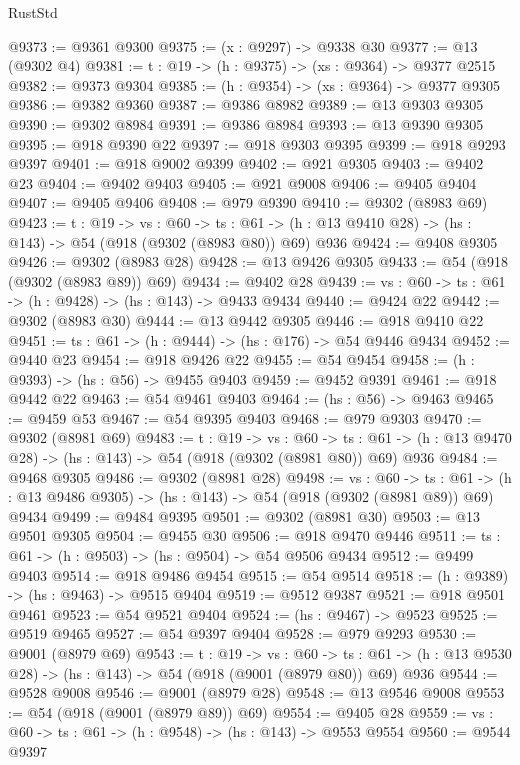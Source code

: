 \begin{lexlean}{RustStd}
\begin{coremodule}
@9373 := @9361 @9300
@9375 := (x : @9297) -> @9338 @30
@9377 := @13 (@9302 @4)
@9381 := {t : @19} -> (h : @9375) -> (xs : @9364) -> @9377 @2515
@9382 := @9373 @9304
@9385 := (h : @9354) -> (xs : @9364) -> @9377 @9305
@9386 := @9382 @9360
@9387 := @9386 @8982
@9389 := @13 @9303 @9305
@9390 := @9302 @8984
@9391 := @9386 @8984
@9393 := @13 @9390 @9305
@9395 := @918 @9390 @22
@9397 := @918 @9303 @9395
@9399 := @918 @9293 @9397
@9401 := @918 @9002 @9399
@9402 := @921 @9305
@9403 := @9402 @23
@9404 := @9402 @9403
@9405 := @921 @9008
@9406 := @9405 @9404
@9407 := @9405 @9406
@9408 := @979 @9390
@9410 := @9302 (@8983 @69)
@9423 := {t : @19} ->
  {vs : @60} ->
  {ts : @61} -> (h : @13 @9410 @28) -> (hs : @143) -> @54 (@918 (@9302 (@8983 @80)) @69) @936
@9424 := @9408 @9305
@9426 := @9302 (@8983 @28)
@9428 := @13 @9426 @9305
@9433 := @54 (@918 (@9302 (@8983 @89)) @69)
@9434 := @9402 @28
@9439 := {vs : @60} -> {ts : @61} -> (h : @9428) -> (hs : @143) -> @9433 @9434
@9440 := @9424 @22
@9442 := @9302 (@8983 @30)
@9444 := @13 @9442 @9305
@9446 := @918 @9410 @22
@9451 := {ts : @61} -> (h : @9444) -> (hs : @176) -> @54 @9446 @9434
@9452 := @9440 @23
@9454 := @918 @9426 @22
@9455 := @54 @9454
@9458 := (h : @9393) -> (hs : @56) -> @9455 @9403
@9459 := @9452 @9391
@9461 := @918 @9442 @22
@9463 := @54 @9461 @9403
@9464 := (hs : @56) -> @9463
@9465 := @9459 @53
@9467 := @54 @9395 @9403
@9468 := @979 @9303
@9470 := @9302 (@8981 @69)
@9483 := {t : @19} ->
  {vs : @60} ->
  {ts : @61} -> (h : @13 @9470 @28) -> (hs : @143) -> @54 (@918 (@9302 (@8981 @80)) @69) @936
@9484 := @9468 @9305
@9486 := @9302 (@8981 @28)
@9498 := {vs : @60} ->
  {ts : @61} -> (h : @13 @9486 @9305) -> (hs : @143) -> @54 (@918 (@9302 (@8981 @89)) @69) @9434
@9499 := @9484 @9395
@9501 := @9302 (@8981 @30)
@9503 := @13 @9501 @9305
@9504 := @9455 @30
@9506 := @918 @9470 @9446
@9511 := {ts : @61} -> (h : @9503) -> (hs : @9504) -> @54 @9506 @9434
@9512 := @9499 @9403
@9514 := @918 @9486 @9454
@9515 := @54 @9514
@9518 := (h : @9389) -> (hs : @9463) -> @9515 @9404
@9519 := @9512 @9387
@9521 := @918 @9501 @9461
@9523 := @54 @9521 @9404
@9524 := (hs : @9467) -> @9523
@9525 := @9519 @9465
@9527 := @54 @9397 @9404
@9528 := @979 @9293
@9530 := @9001 (@8979 @69)
@9543 := {t : @19} ->
  {vs : @60} ->
  {ts : @61} -> (h : @13 @9530 @28) -> (hs : @143) -> @54 (@918 (@9001 (@8979 @80)) @69) @936
@9544 := @9528 @9008
@9546 := @9001 (@8979 @28)
@9548 := @13 @9546 @9008
@9553 := @54 (@918 (@9001 (@8979 @89)) @69)
@9554 := @9405 @28
@9559 := {vs : @60} -> {ts : @61} -> (h : @9548) -> (hs : @143) -> @9553 @9554
@9560 := @9544 @9397

\end{coremodule}
\end{lexlean}
